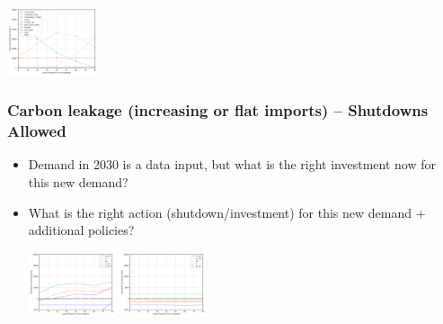 \documentclass[xcolor=dvipsnames]{beamer}
\begin{document}
\begin{frame}
\begin{itemize}
  \includegraphics[width=0.2\textwidth]{includes/no_leakage_no_shutdowns_agg_generation_cntlreg.png}

\end{itemize}

\end{frame}


\begin{frame}
  \frametitle{Carbon leakage (increasing or flat imports) -- Shutdowns Allowed}
\begin{itemize}
  \item Demand in 2030 is a data input, but what is the right investment now for this new demand?
  \item What is the right action (shutdown/investment) for this new demand + additional policies?



  \includegraphics[width=0.2\textwidth]{includes/leakage_shutdowns_agg_exim.png}
  \includegraphics[width=0.2\textwidth]{includes/no_leakage_shutdowns_agg_exim.png}


\end{itemize}
\end{frame}
\end{document}
